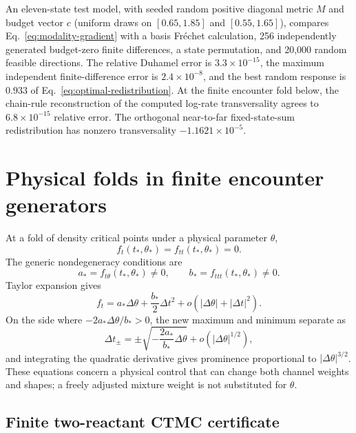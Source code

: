 \documentclass[aps,pre,reprint,amsmath,amssymb,longbibliography,floatfix]{revtex4-2}
\begin{document}
An eleven-state test model, with seeded random positive diagonal metric
\(M\) and budget vector \(c\) (uniform draws on \([0.65,1.85]\) and
\([0.55,1.65]\)), compares Eq.~\eqref{eq:modality-gradient} with a
basis Fr\'echet calculation, 256 independently generated budget-zero finite differences, a
state permutation, and 20,000 random feasible directions. The relative
Duhamel error is \(3.3\times10^{-15}\), the maximum independent finite-difference
error is \(2.4\times10^{-8}\), and the best random response is \(0.933\) of
Eq.~\eqref{eq:optimal-redistribution}. At the finite encounter fold below,
the chain-rule reconstruction of the computed log-rate transversality agrees
to \(6.8\times10^{-15}\) relative error. The orthogonal near-to-far
fixed-state-sum redistribution has nonzero transversality
\(-1.1621\times10^{-5}\).

\section{Physical folds in finite encounter generators}
\label{sec:fold-results}

At a fold of density critical points under a physical parameter \(\theta\),
\begin{equation}
f_t(t_*,\theta_*)=f_{tt}(t_*,\theta_*)=0.
\label{eq:physical-fold}
\end{equation}
The generic nondegeneracy conditions are
\begin{equation}
a_*=f_{t\theta}(t_*,\theta_*)\ne0,\qquad
b_*=f_{ttt}(t_*,\theta_*)\ne0.
\label{eq:fold-nondegenerate}
\end{equation}
Taylor expansion gives
\[
f_t=a_*\Delta\theta+\frac{b_*}{2}\Delta t^2+
o(|\Delta\theta|+|\Delta t|^2).
\]
On the side where \(-2a_*\Delta\theta/b_*>0\), the new maximum and minimum
separate as
\begin{equation}
\Delta t_\pm=
\pm\sqrt{-\frac{2a_*}{b_*}\Delta\theta}
+o(|\Delta\theta|^{1/2}),
\label{eq:fold-roots}
\end{equation}
and integrating the quadratic derivative gives prominence proportional to
\(|\Delta\theta|^{3/2}\). These equations concern a physical control that can
change both channel weights and shapes; a freely adjusted mixture weight is
not substituted for \(\theta\).

\subsection{Finite two-reactant CTMC certificate}
\label{sec:finite-ctmc}
\end{document}
